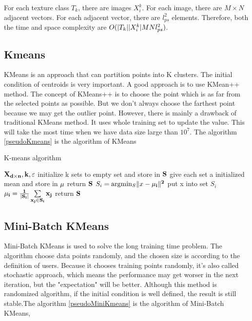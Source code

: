 \documentclass[final,leqno,onefignum,onetabnum]{siamltexmm}
\DeclarePairedDelimiter\abs{\lvert}{\rvert}%
\DeclarePairedDelimiter\norm{\lVert}{\rVert}%
\newcommand{\argmin}{\arg\!\min}
\begin{document}

For each texture class \(T_k \), there are images \(X_i^k\). For each image, there are $M \times N$ adjacent vectors. For each adjacent vector, there are $l_{ps}^2$ elements. Therefore, both the time and space complexity are $O(\abs{T_k}\abs{X_i^k}MNl_{ps}^2)$.


\subsection {Kmeans}
KMeans is an approach that can partition points into K clusters. The initial condition of centroids is very important. A good approach is to use KMean++ method. The concept of KMeans++ is to choose the point which is as far from the selected points as possible. But we don't always choose the farthest point because we may get the outlier point. However, there is mainly a drawback of traditional KMeans method. It uses whole training set to update the value. This will take the most time when we have data size large than $10^7$. The algorithm \ref{pseudoKmeans} is the algorithm of KMeans \\
\begin{algorithm}
	\caption{K-means algorithm}
	\label{pseudoKmeans}
	\begin{algorithmic}[1]
		 {$\bf{X}_{d \times n}, k, \varepsilon$}
		\State initialize k sets to empty set and store in $\bf{S}$
		\State give each set a initialized mean and store in $\bf{\mu}$
		\State return $\bf{S}$
		\EndIf
		\State $S_i = \argmin_S \norm{x - \bf{\mu}_i}^2$
		\State put x into set $S_i$
		\EndFor
		\State $ \bf{\mu}_i = \frac{1}{\abs{S_i}}\sum \limits_{x_j \in S_i} x_j $
		\EndFor
		\EndFor 
		\State return $\bf{S}$
		\EndProcedure
	\end{algorithmic}
\end{algorithm}

\subsection{Mini-Batch KMeans}

Mini-Batch KMeans is used to solve the long training time problem. The algorithm choose data points randomly, and the chosen size is according to the definition of users. Because it chooses training points randomly, it's also called stochastic approach, which means the performance may get worser in the next iteration, but the "expectation" will be better. Although this method is randomized algorithm, if the initial condition is well defined, the result is still stable.The algorithm \ref{pseudoMiniKmeans} is the algorithm of Mini-Batch KMeans, \\
\end{document}
